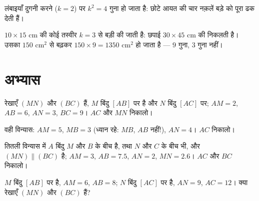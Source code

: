 \begin{omfigure}

{\small लंबाइयाँ दुगनी करने ($k = 2$) पर  $k^2 = 4$ गुना हो
जाता है: छोटे आयत की चार नक़लें बड़े को पूरा ढक देती हैं।}
\end{omfigure}

\begin{example}
$10 \times 15$ cm की कोई तस्वीर $k = 3$  से बड़ी की जाती है:
छपाई $30 \times 45$ cm की निकलती है। उसका  $150$ cm$^2$ से
बढ़कर $150 \times 9 = 1350$ cm$^2$ हो जाता है --- $9$ गुना, $3$ गुना
नहीं।
\end{example}

\section{अभ्यास}

\begin{exercise}[$\star$]\label{exo:g9:thales:1}
रेखाएँ $(MN)$ और $(BC)$  हैं, $M$ बिंदु $[AB]$ पर है और $N$
बिंदु $[AC]$ पर; $AM = 2$, $AB = 6$, $AN = 3$, $BC = 9$। $AC$ और $MN$
निकालो।
\end{exercise}

\begin{exercise}[$\star$]\label{exo:g9:thales:2}
वही विन्यास: $AM = 5$, $MB = 3$ (ध्यान रहे: $MB$, $AB$ नहीं!),
$AN = 4$। $AC$ निकालो।
\end{exercise}

\begin{exercise}[$\star$]\label{exo:g9:thales:3}
तितली विन्यास में $A$ बिंदु $M$ और $B$ के बीच है, तथा $N$ और $C$ के
बीच भी, और $(MN) \parallel (BC)$ है; $AM = 3$, $AB = 7.5$, $AN = 2$,
$MN = 2.6$। $AC$ और $BC$ निकालो।
\end{exercise}

\begin{exercise}[$\star$]\label{exo:g9:thales:4}
$M$ बिंदु $[AB]$ पर है, $AM = 6$, $AB = 8$; $N$ बिंदु $[AC]$ पर है,
$AN = 9$, $AC = 12$। क्या रेखाएँ $(MN)$ और $(BC)$  हैं?
\end{exercise}

